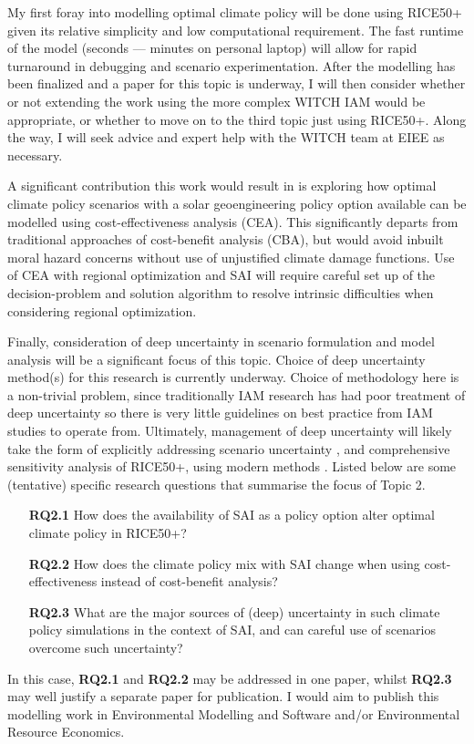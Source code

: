 \documentclass{article}
\begin{document}
My first foray into modelling optimal climate policy will be done using RICE50+ given its relative simplicity and low computational requirement. The fast runtime of the model (seconds --- minutes on personal laptop) will allow for rapid turnaround in debugging and scenario experimentation. After the modelling has been finalized and a paper for this topic is underway, I will then consider whether or not extending the work using the more complex WITCH IAM would be appropriate, or whether to move on to the third topic just using RICE50+. Along the way, I will seek advice and expert help with the WITCH team at EIEE as necessary.\medskip

A significant contribution this work would result in is exploring how optimal climate policy scenarios with a solar geoengineering policy option available can be modelled using cost-effectiveness analysis (CEA). This significantly departs from traditional approaches of cost-benefit analysis (CBA), but would avoid inbuilt moral hazard concerns without use of unjustified climate damage functions. Use of CEA with regional optimization and SAI will require careful set up of the decision-problem and solution algorithm to resolve intrinsic difficulties when considering regional optimization. \medskip

Finally, consideration of deep uncertainty in scenario formulation and model analysis will be a significant focus of this topic. Choice of deep uncertainty method(s) for this research is currently underway. Choice of methodology here is a non-trivial problem, since traditionally IAM research has had poor treatment of deep uncertainty so there is very little guidelines on best practice from IAM studies to operate from. Ultimately, management of deep uncertainty will likely take the form of explicitly addressing scenario uncertainty \citep{elsawah2020scenario}, and comprehensive sensitivity analysis of RICE50+, using modern methods \citep{saltelli2008global}. Listed below are some (tentative) specific research questions that summarise the focus of Topic 2.

\begin{enumerate}
    \item[\textbf{RQ2.1}] How does the availability of SAI as a policy option alter optimal climate policy in RICE50+?
    \item[\textbf{RQ2.2}] How does the climate policy mix with SAI change when using cost-effectiveness instead of cost-benefit analysis?
    \item[\textbf{RQ2.3}] What are the major sources of (deep) uncertainty in such climate policy simulations in the context of SAI, and can careful use of scenarios overcome such uncertainty?
\end{enumerate}
In this case, \textbf{RQ2.1} and \textbf{RQ2.2} may be addressed in one paper, whilst \textbf{RQ2.3} may well justify a separate paper for publication. I would aim to publish this modelling work in Environmental Modelling and Software and/or Environmental Resource Economics. \clearpage
\end{document}

